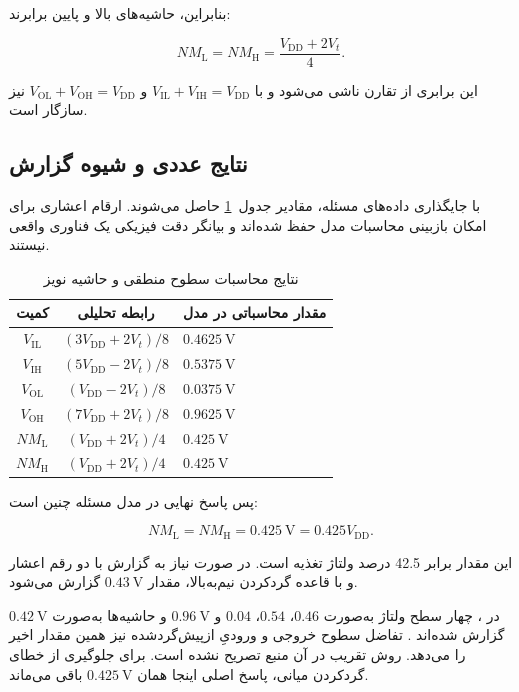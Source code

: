 بنابراین، حاشیه‌های بالا و پایین برابرند:

\nopagebreak[3]
\begin{equation}\label{eq:ex17-11}
\boxed{
NM_{\mathrm{L}}=NM_{\mathrm{H}}
=\frac{V_{\mathrm{DD}}+2V_t}{4}
}.
\end{equation}

این برابری از تقارن  ناشی می‌شود و با \(V_{\mathrm{IL}}+V_{\mathrm{IH}}=V_{\mathrm{DD}}\) و \(V_{\mathrm{OL}}+V_{\mathrm{OH}}=V_{\mathrm{DD}}\) نیز سازگار است.

\clearpage
\subsection*{نتایج عددی و شیوه گزارش}

با جایگذاری داده‌های مسئله، مقادیر جدول~\ref{tab:noise} حاصل می‌شوند. ارقام اعشاری برای امکان بازبینی محاسبات مدل حفظ شده‌اند و بیانگر دقت فیزیکی یک فناوری واقعی نیستند.

\begin{table}[htbp]\centering
\caption{نتایج محاسبات سطوح منطقی و حاشیه نویز}
\label{tab:noise}
\begin{tabularx}{\linewidth}{ccX}\toprule
کمیت & رابطه تحلیلی & مقدار محاسباتی در مدل\\
\midrule
\(V_{\mathrm{IL}}\) & \((3V_{\mathrm{DD}}+2V_t)/8\) & \(\qty{0.4625}{\volt}\)\\
\(V_{\mathrm{IH}}\) & \((5V_{\mathrm{DD}}-2V_t)/8\) & \(\qty{0.5375}{\volt}\)\\
\(V_{\mathrm{OL}}\) & \((V_{\mathrm{DD}}-2V_t)/8\) & \(\qty{0.0375}{\volt}\)\\
\(V_{\mathrm{OH}}\) & \((7V_{\mathrm{DD}}+2V_t)/8\) & \(\qty{0.9625}{\volt}\)\\
\(NM_{\mathrm{L}}\) & \((V_{\mathrm{DD}}+2V_t)/4\) & \(\qty{0.425}{\volt}\)\\
\(NM_{\mathrm{H}}\) & \((V_{\mathrm{DD}}+2V_t)/4\) & \(\qty{0.425}{\volt}\)\\
\bottomrule\end{tabularx}\end{table}

پس پاسخ نهایی در مدل مسئله چنین است:

\nopagebreak[3]
\begin{equation}\label{eq:ex17-12}
\boxed{NM_{\mathrm{L}}=NM_{\mathrm{H}}=\qty{0.425}{\volt}
=0.425V_{\mathrm{DD}}}.
\end{equation}

این مقدار برابر \num{42.5} درصد ولتاژ تغذیه است. در صورت نیاز به گزارش با دو رقم اعشار و با قاعده گردکردن نیم‌به‌بالا، مقدار \(\qty{0.43}{\volt}\) گزارش می‌شود.

در ، چهار سطح ولتاژ به‌صورت \(0.46\)، \(0.54\)، \(0.04\) و \(\qty{0.96}{\volt}\) و حاشیه‌ها به‌صورت \(\qty{0.42}{\volt}\) گزارش شده‌اند \cite[صفحات ۵ و ۶]{manual}. تفاضل سطوح خروجی و ورودیِ ازپیش‌گردشده نیز همین مقدار اخیر را می‌دهد. روش تقریب در آن منبع تصریح نشده است. برای جلوگیری از خطای گردکردن میانی، پاسخ اصلی اینجا همان \(\qty{0.425}{\volt}\) باقی می‌ماند.

